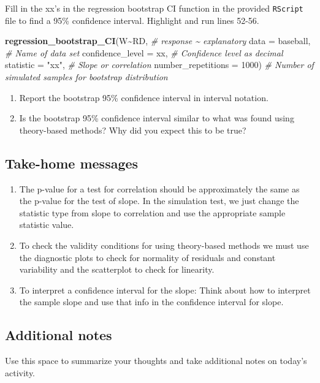 \documentclass[
]{report}
\newenvironment{Shaded}{\begin{snugshade}}{\end{snugshade}}
\newcommand{\CommentTok}[1]{\textcolor[rgb]{0.56,0.35,0.01}{\textit{#1}}}
\newcommand{\DataTypeTok}[1]{\textcolor[rgb]{0.13,0.29,0.53}{#1}}
\newcommand{\DecValTok}[1]{\textcolor[rgb]{0.00,0.00,0.81}{#1}}
\newcommand{\KeywordTok}[1]{\textcolor[rgb]{0.13,0.29,0.53}{\textbf{#1}}}
\newcommand{\NormalTok}[1]{#1}
\newcommand{\OperatorTok}[1]{\textcolor[rgb]{0.81,0.36,0.00}{\textbf{#1}}}
\newcommand{\StringTok}[1]{\textcolor[rgb]{0.31,0.60,0.02}{#1}}
\begin{document}
\vspace{0.5in}

Fill in the xx's in the regression bootstrap CI function in the provided \texttt{RScript} file to find a 95\% confidence interval. Highlight and run lines 52-56.

\begin{Shaded}
\begin{Highlighting}[]
\KeywordTok{regression\_bootstrap\_CI}\NormalTok{(W}\OperatorTok{\textasciitilde{}}\NormalTok{RD, }\CommentTok{\# response \textasciitilde{} explanatory}
                        \DataTypeTok{data =}\NormalTok{ baseball, }\CommentTok{\# Name of data set}
                        \DataTypeTok{confidence\_level =}\NormalTok{ xx, }\CommentTok{\# Confidence level as decimal}
                        \DataTypeTok{statistic =} \StringTok{"xx"}\NormalTok{, }\CommentTok{\# Slope or correlation}
                        \DataTypeTok{number\_repetitions =} \DecValTok{1000}\NormalTok{) }\CommentTok{\# Number of simulated samples for bootstrap distribution}
\end{Highlighting}
\end{Shaded}

\begin{enumerate}
\def\labelenumi{\arabic{enumi}.}
\setcounter{enumi}{3}
\item
  Report the bootstrap 95\% confidence interval in interval notation.\\
  \vspace{0.5in}
\item
  Is the bootstrap 95\% confidence interval similar to what was found using theory-based methods? Why did you expect this to be true?
\end{enumerate}

\vspace{1in}

\hypertarget{take-home-messages-11}{%
\subsection{Take-home messages}\label{take-home-messages-11}}

\begin{enumerate}
\def\labelenumi{\arabic{enumi}.}
\item
  The p-value for a test for correlation should be approximately the same as the p-value for the test of slope. In the simulation test, we just change the statistic type from slope to correlation and use the appropriate sample statistic value.
\item
  To check the validity conditions for using theory-based methods we must use the diagnostic plots to check for normality of residuals and constant variability and the scatterplot to check for linearity.
\item
  To interpret a confidence interval for the slope: Think about how to interpret the sample slope and use that info in the confidence interval for slope.
\end{enumerate}

\hypertarget{additional-notes-11}{%
\subsection{Additional notes}\label{additional-notes-11}}

Use this space to summarize your thoughts and take additional notes on today's activity.
\end{document}
